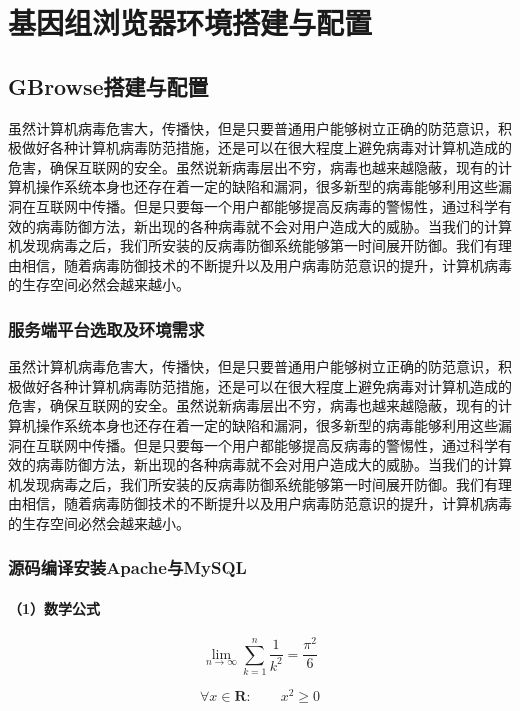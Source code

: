 \chapter{基因组浏览器环境搭建与配置}
	\section{GBrowse搭建与配置}
	虽然计算机病毒危害大，传播快，但是只要普通用户能够树立正确的防范意识，积极做好各种计算机病毒防范措施，还是可以在很大程度上避免病毒对计算机造成的危害，确保互联网的安全。虽然说新病毒层出不穷，病毒也越来越隐蔽，现有的计算机操作系统本身也还存在着一定的缺陷和漏洞，很多新型的病毒能够利用这些漏洞在互联网中传播。但是只要每一个用户都能够提高反病毒的警惕性，通过科学有效的病毒防御方法，新出现的各种病毒就不会对用户造成大的威胁。当我们的计算机发现病毒之后，我们所安装的反病毒防御系统能够第一时间展开防御。我们有理由相信，随着病毒防御技术的不断提升以及用户病毒防范意识的提升，计算机病毒的生存空间必然会越来越小。
	\subsection{服务端平台选取及环境需求}
	虽然计算机病毒危害大，传播快，但是只要普通用户能够树立正确的防范意识，积极做好各种计算机病毒防范措施，还是可以在很大程度上避免病毒对计算机造成的危害，确保互联网的安全。虽然说新病毒层出不穷，病毒也越来越隐蔽，现有的计算机操作系统本身也还存在着一定的缺陷和漏洞，很多新型的病毒能够利用这些漏洞在互联网中传播。但是只要每一个用户都能够提高反病毒的警惕性，通过科学有效的病毒防御方法，新出现的各种病毒就不会对用户造成大的威胁。当我们的计算机发现病毒之后，我们所安装的反病毒防御系统能够第一时间展开防御。我们有理由相信，随着病毒防御技术的不断提升以及用户病毒防范意识的提升，计算机病毒的生存空间必然会越来越小。
	\subsection{源码编译安装Apache与MySQL}
		\subsubsection{（1）数学公式}
		\begin{displaymath}
		\lim_{n \to \infty}
		\sum_{k=1}^n \frac{1}{k^2}
		= \frac{\pi^2}{6}
		\end{displaymath}
		
		\begin{equation}
		\forall x \in \mathbf{R}:
		\qquad x^{2} \geq 0
		\end{equation}
